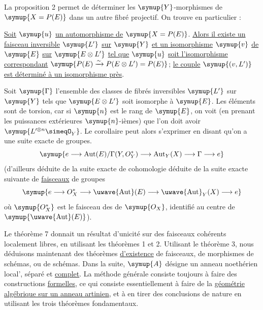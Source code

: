 La proposition 2 permet de déterminer les $\symup{Y}$-morphismes de $\symup{X=P(E)}$
dans un autre fibré projectif. On trouve en particulier :

 \uline{Soit} $\symup{u}$ \uline{un automorphisme de} $\symup{X=P(E)}$. \uline{Alors il
existe un faisceau inversible} $\symup{L'}$ \uline{sur} $\symup{Y}$ \uline{et un isomorphisme} $\symup{v}$ \uline{de} $\symup{E}$ \uline{sur}
$\symup{E\otimes L'}$ \uline{tel que} $\symup{u}$ \uline{soit l'isomorphisme correspondant}
$\symup{P(E)\xrightarrow{\sim}P(E\otimes L')=P(E)}$;
\uline{le couple} $\symup{(v,L')}$ \uline{est déterminé à un isomorphisme près}.

Soit $\symup{\Gamma}$ l'ensemble des classes de fibrés inversibles $\symup{L'}$ sur $\symup{Y}$ tels
que $\symup{E\otimes L'}$ soit isomorphe à $\symup{E}$. Les éléments sont de torsion, car si
$\symup{n}$ est le rang de $\symup{E}$, on voit (en prenant les puissances extérieures
$\symup{n}$-ièmes) que l'on doit avoir $\symup{L'^{\otimes n}\simeqO_Y}$. Le corollaire peut
alors s'exprimer en disant qu'on a une suite exacte de groupes.
\[
  \symup{e\longrightarrow
  \operatorname{Aut}(E)/\Gamma(Y,O_Y^*)
  \longrightarrow \operatorname{Aut}_Y(X)
  \longrightarrow \Gamma\longrightarrow e}
\]
(d'ailleurs déduite de la suite exacte de cohomologie déduite de la suite
exacte suivante de \uline{faisceaux} de groupes
\[
  \symup{e\longrightarrow O_X^*
  \longrightarrow \mathop{\text{\uwave{Aut}}}\nolimits(E)
  \longrightarrow \mathop{\text{\uwave{Aut}}}\nolimits_Y(X)
  \longrightarrow e}
\]
où $\symup{O_X^*}$ est le faisceau des  de $\symup{O_X}$, identifié au centre
de $\symup{\mathop{\text{\uwave{Aut}}}\nolimits(E)}$).


Le théorème 7 donnait un résultat d'unicité sur des faisceaux cohérents
localement libres, en utilisant les théorèmes 1 et 2. Utilisant le théorème 3,
nous déduisons maintenant des théorèmes \uline{d'existence} de faisceaux, de morphismes
de schémas, ou de schémas. Dans la suite, $\symup{A}$ désigne un anneau noethérien
local', séparé et \uline{complet}. La méthode générale consiste toujours à faire des
constructions \uline{formelles}, ce qui consiste essentiellement à faire de la
\uline{géométrie algébrique sur un anneau artinien}, et à en tirer des conclusions de
nature  en utilisant les trois théorèmes fondamentaux.

